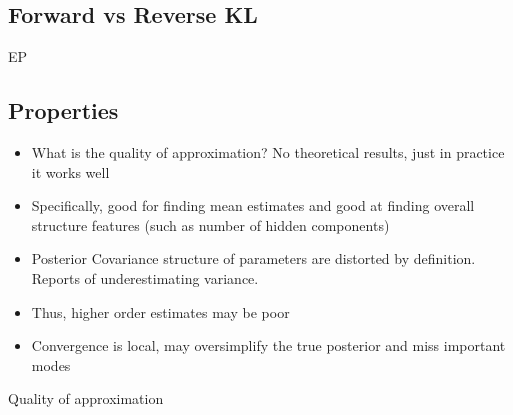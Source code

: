 \subsection{Forward vs Reverse KL}

\begin{frame}
  EP
\end{frame}

\subsection{Properties}

\begin{frame}
  \begin{itemize}
    \item What is the quality of approximation? No theoretical results, just in practice it works well
    \item Specifically, good for finding mean estimates and good at finding overall structure features (such as number of hidden components)
    \item Posterior Covariance structure of parameters are distorted by definition. Reports of underestimating variance.
    \item Thus, higher order estimates may be poor
    \item Convergence is local, may oversimplify the true posterior and miss important modes
  \end{itemize}
  Quality of approximation
\end{frame}
